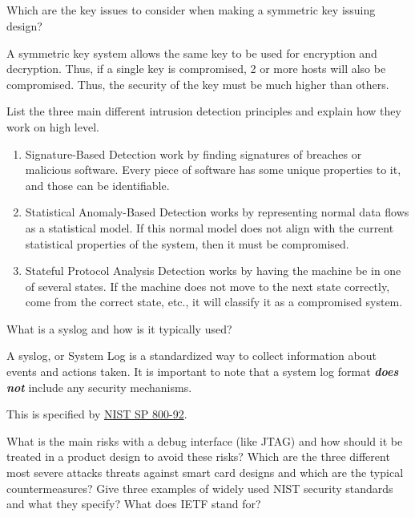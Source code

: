 \begin{questions}
\begin{parts}
  \part{} Which are the key issues to consider when making a symmetric key issuing design?
    \begin{solution}
      A symmetric key system allows the same key to be used for encryption and decryption.
      Thus, if a single key is compromised, 2 or more hosts will also be compromised.
      Thus, the security of the key must be much higher than others.
    \end{solution}
  \end{parts}

\question{} List the three main different intrusion detection principles and explain how they work on high level.
  \begin{solution}
    \begin{enumerate}[noitemsep]
    \item Signature-Based Detection work by finding signatures of breaches or malicious software.
      Every piece of software has some unique properties to it, and those can be identifiable.
    \item Statistical Anomaly-Based Detection works by representing normal data flows as a statistical model.
      If this normal model does not align with the current statistical properties of the system, then it must be compromised.
    \item Stateful Protocol Analysis Detection works by having the machine be in one of several states.
      If the machine does not move to the next state correctly, come from the correct state, etc., it will classify it as a compromised system.
    \end{enumerate}
  \end{solution}

\question{} What is a syslog and how is it typically used?
  \begin{solution}
    A syslog, or System Log is a standardized way to collect information about events and actions taken.
    It is important to note that a system log format \emph{\textbf{does not}} include any security mechanisms.

    This is specified by \href{https://nvlpubs.nist.gov/nistpubs/Legacy/SP/nistspecialpublication800-92.pdf}{NIST SP 800-92}.
  \end{solution}

\question{} What is the main risks with a debug interface (like JTAG) and how should it be treated in a product design to avoid these risks?
\question{} Which are the three different most severe attacks threats against smart card designs and which are the typical countermeasures?
\question{} Give three examples of widely used NIST security standards and what they specify?
\question{} What does IETF stand for?
  \begin{parts}

\end{parts}
\end{questions}
